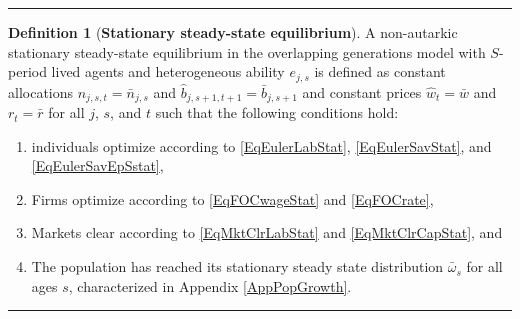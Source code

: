 \documentclass[letterpaper,12pt]{article}
\theoremstyle{definition}
\newtheorem{definition}{Definition} %
\begin{document}
    \hrule
    \begin{definition}[\textbf{Stationary steady-state equilibrium}]\label{DefEquilSS}
      A non-autarkic stationary steady-state equilibrium in the overlapping generations model with $S$-period lived agents and heterogeneous ability $e_{j,s}$ is defined as constant allocations $n_{j,s,t}=\bar{n}_{j,s}$ and $\hat{b}_{j,s+1,t+1}=\bar{b}_{j,s+1}$ and constant prices $\hat{w}_t=\bar{w}$ and $r_t=\bar{r}$ for all $j$, $s$, and $t$ such that the following conditions hold:
       \begin{enumerate}
          \item individuals optimize according to \eqref{EqEulerLabStat}, \eqref{EqEulerSavStat}, and \eqref{EqEulerSavEpSstat},
          \item Firms optimize according to \eqref{EqFOCwageStat} and \eqref{EqFOCrate},
          \item Markets clear according to \eqref{EqMktClrLabStat} and \eqref{EqMktClrCapStat}, and
          \item The population has reached its stationary steady state distribution $\bar{\omega}_s$ for all ages $s$, characterized in Appendix \ref{AppPopGrowth}.
       \end{enumerate}
    \end{definition}
    \hrule
\end{document}
